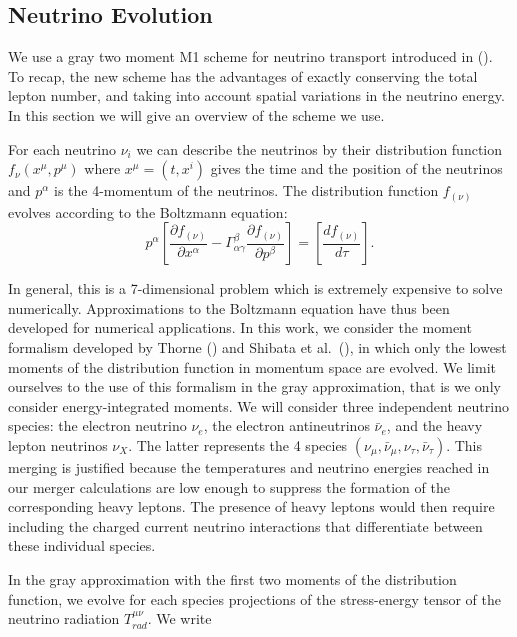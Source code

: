 \subsection{Neutrino Evolution}

We use a gray two moment M1 scheme for neutrino transport introduced in (\cite{foucart2016impact}). To recap, the new scheme has the advantages of exactly conserving the total lepton number, and taking into account spatial variations in the neutrino energy. In this section we will give an overview of the scheme we use.

For each neutrino $\nu_i$ we can describe the neutrinos by their distribution function $f_{\nu}(x^\mu, p^\mu)$ where $x^\mu = (t, x^i)$ gives the time and the position of the neutrinos and $p^\alpha$ is the 4-momentum of the neutrinos. The distribution function $f_{(\nu)}$ evolves according to the Boltzmann equation:
\begin{equation}
  p^\alpha\left[ \frac{\partial f_{(\nu)}}{\partial x^\alpha} - \Gamma^\beta_{\alpha\gamma}\frac{\partial f_{(\nu)}}{\partial p^\beta}\right] = \left[\frac{df_{(\nu)}}{d\tau}\right].
\end{equation}

In general, this is a 7-dimensional problem which is extremely expensive to solve numerically. Approximations to the Boltzmann equation have thus been developed for numerical applications. In this work, we consider the moment formalism developed by Thorne (\cite{1981mnras.194..439t}) and Shibata et al.~(\cite{shibata:11}), in which only the lowest moments of the distribution function in momentum space are evolved.  We limit ourselves to the use of this formalism in the gray approximation, that is we only consider energy-integrated moments.  We will consider three independent neutrino species: the electron neutrino $\nu_e$, the electron antineutrinos $\bar \nu_e$, and the heavy lepton neutrinos $\nu_X$. The latter represents the 4 species $(\nu_\mu, \bar \nu_\mu, \nu_\tau, \bar \nu_\tau)$. This merging is justified because the temperatures and neutrino energies reached in our merger calculations are low enough to suppress the formation of the corresponding heavy leptons. The presence of heavy leptons would then require including the charged current neutrino interactions that differentiate between these individual species.

In the gray approximation with the first two moments of the distribution function, we evolve for each species projections of the stress-energy tensor of the neutrino radiation $T^{\mu\nu}_{rad}$. We write

